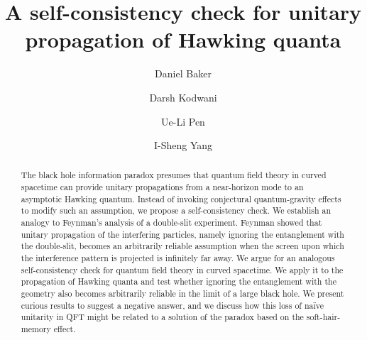 \documentclass[aps,showpacs,onecolumn,floats,prd,superscriptaddress,nofootinbib]{revtex4-1}
\begin{document}
\title{A self-consistency check for unitary propagation of Hawking quanta}

\author{Daniel Baker}

\author{Darsh Kodwani}

\author{Ue-Li Pen}

\author{I-Sheng Yang}


\begin{abstract}
The black hole information paradox presumes that quantum field theory in curved spacetime can provide unitary propagations from a near-horizon mode to an asymptotic Hawking quantum. 
Instead of invoking conjectural quantum-gravity effects to modify such an assumption, we propose a self-consistency check.
We establish an analogy to Feynman's analysis of a double-slit experiment. 
Feynman showed that unitary propagation of the interfering particles, namely ignoring the entanglement with the double-slit, becomes an arbitrarily reliable assumption when the screen upon which the interference pattern is projected is infinitely far away.
We argue for an analogous self-consistency check for quantum field theory in curved spacetime.
We apply it to the propagation of Hawking quanta and test whether ignoring the entanglement with the geometry also becomes arbitrarily reliable in the limit of a large black hole. 
We present curious results to suggest a negative answer, and we discuss how this loss of na\"ive unitarity in QFT might be related to a solution of the paradox based on the soft-hair-memory effect.
\end{abstract}
\end{document}
